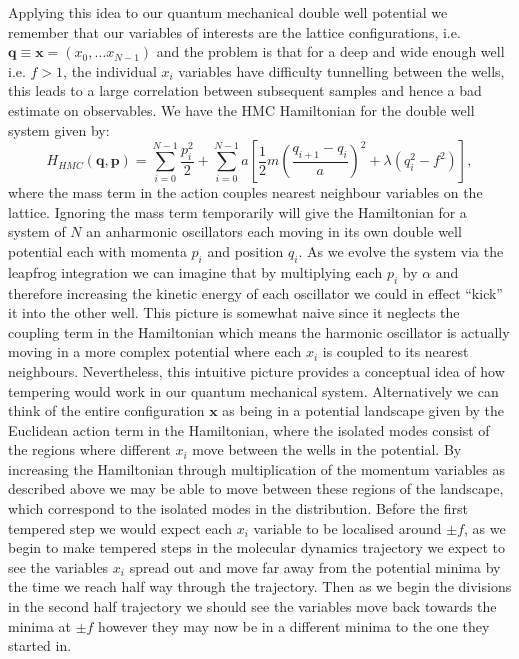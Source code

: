 \documentclass[12pt]{article}
\begin{document}
    Applying this idea to our quantum mechanical double well potential we remember that our variables of interests are the lattice configurations, i.e. $\bm{q}\equiv\bm{x}=\left(x_0,\dots x_{N-1}\right)$ and the problem is that for a deep and wide enough well i.e. $f>1$, the individual $x_i$ variables have difficulty tunnelling between the wells, this leads to a large correlation between subsequent samples and hence a bad estimate on observables. We have the HMC Hamiltonian for the double well system given by:
    \begin{equation}
        H_{HMC}\left(\bm{q},\bm{p}\right) = \sum_{i=0}^{N-1}\frac{p_i^2}{2} + \sum_{i=0}^{N-1} a \left[\frac{1}{2}m\left(\frac{q_{i+1}-q_{i}}{a}\right)^2 + \lambda\left(q_i^2-f^2\right)\right],
    \end{equation}
    where the mass term in the action couples nearest neighbour variables on the lattice. Ignoring the mass term temporarily will give the Hamiltonian for a system of $N$ an anharmonic oscillators each moving in its own double well potential each with momenta $p_i$ and position $q_i$. As we evolve the system via the leapfrog integration we can imagine that by multiplying each $p_i$ by $\alpha$ and therefore increasing the kinetic energy of each oscillator we could in effect ``kick'' it into the other well. This picture is somewhat naive since it neglects the coupling term in the Hamiltonian which means the harmonic oscillator is actually moving in a more complex potential where each $x_i$ is coupled to its nearest neighbours. Nevertheless, this intuitive picture provides a conceptual idea of how tempering would work in our quantum mechanical system. Alternatively we can think of the entire configuration $\bm{x}$ as being in a potential landscape given by the Euclidean action term in the Hamiltonian, where the isolated modes consist of the regions where different $x_i$ move between the wells in the potential. By increasing the Hamiltonian through multiplication of the momentum variables as described above we may be able to move between these regions of the landscape, which correspond to the isolated modes in the distribution. Before the first tempered step we would expect each $x_i$ variable to be localised around $\pm f$, as we begin to make tempered steps in the molecular dynamics trajectory we expect to see the variables $x_i$ spread out and move far away from the potential minima by the time we reach half way through the trajectory. Then as we begin the divisions in the second half trajectory we should see the variables move back towards the minima at $\pm f$ however they may now be in a different minima to the one they started in.
\end{document}

